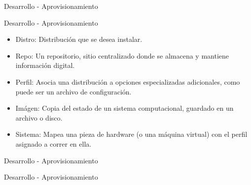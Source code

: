 \begin{frame}{Desarrollo - Aprovisionamiento}
    \vspace{-1.5cm}
    \begin{figure}[ht]
       \centering
       \vspace{-0.50cm}
    \end{figure}
\end{frame}

\begin{frame}{Desarrollo - Aprovisionamiento}
    \vspace{-1.5cm}
    \begin{itemize}
        \item Distro: Distribución que se desea instalar. 
        \item Repo: Un repositorio, sitio centralizado donde se almacena y mantiene información digital.
        \item Perfil: Asocia una distribución a opciones especializadas adicionales, como puede ser un archivo de configuración.
        \item Imágen: Copia del estado de un sistema computacional, guardado en un archivo o disco.
        \item Sistema: Mapea una pieza de hardware (o una máquina virtual) con el perfil asignado a correr en ella. 
    \end{itemize}

\end{frame}

\begin{frame}{Desarrollo - Aprovisionamiento}
    \vspace{-1.5cm}
    \begin{figure}[ht]
       \centering
       \vspace{-0.50cm}
    \end{figure}

\end{frame}

\begin{frame}{Desarrollo - Aprovisionamiento}
    \vspace{-1.5cm}
    \begin{figure}[ht]
       \centering
       \vspace{-0.50cm}
    \end{figure}

\end{frame}

